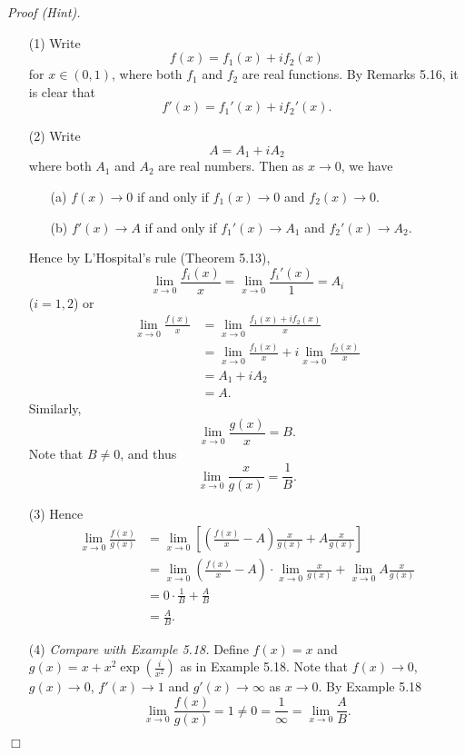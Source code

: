 \documentclass{article}
\begin{document}
\emph{Proof (Hint).}
\begin{enumerate}
  \item[(1)]
  Write
  \[
    f(x) = f_1(x) + i f_2(x)
  \]
  for $x \in (0,1)$,
  where both $f_1$ and  $f_2$ are real functions.
  By Remarks 5.16, it is clear that
  \[
    f'(x) = f_1'(x) + i f_2'(x).
  \]

  \item[(2)]
  Write
  \[
    A = A_1 + i A_2
  \]
  where both $A_1$ and $A_2$ are real numbers.
  Then as $x \to 0$, we have
  \begin{enumerate}
    \item[(a)]
    $f(x) \to 0$ if and only if $f_1(x) \to 0$ and $f_2(x) \to 0$.

    \item[(b)]
    $f'(x) \to A$ if and only if $f_1'(x) \to A_1$ and $f_2'(x) \to A_2$.
  \end{enumerate}

  Hence by L'Hospital's rule (Theorem 5.13),
  \[
    \lim_{x \to 0} \frac{f_i(x)}{x}
    = \lim_{x \to 0} \frac{f_i'(x)}{1} = A_i
  \]
  ($i = 1, 2$) or
  \begin{align*}
    \lim_{x \to 0} \frac{f(x)}{x}
    &= \lim_{x \to 0} \frac{f_1(x) + i f_2(x)}{x} \\
    &= \lim_{x \to 0} \frac{f_1(x)}{x} + i \lim_{x \to 0} \frac{f_2(x)}{x} \\
    &= A_1 + i A_2 \\
    &= A.
  \end{align*}
  Similarly,
  \[
    \lim_{x \to 0} \frac{g(x)}{x} = B.
  \]
  Note that $B \neq 0$, and thus
  \[
    \lim_{x \to 0} \frac{x}{g(x)} = \frac{1}{B}.
  \]

  \item[(3)]
  Hence
  \begin{align*}
    \lim_{x \to 0} \frac{f(x)}{g(x)}
    &= \lim_{x \to 0}
      \left[ \left( \frac{f(x)}{x} - A \right) \frac{x}{g(x)} + A\frac{x}{g(x)} \right] \\
    &= \lim_{x \to 0} \left( \frac{f(x)}{x} - A \right) \cdot \lim_{x \to 0} \frac{x}{g(x)}
      + \lim_{x \to 0} A\frac{x}{g(x)} \\
    &= 0 \cdot \frac{1}{B} + \frac{A}{B} \\
    &= \frac{A}{B}.
  \end{align*}

  \item[(4)]
  \emph{Compare with Example 5.18.}
  Define $f(x) = x$ and $g(x) = x + x^2 \exp(\frac{i}{x^2})$ as in Example 5.18.
  Note that $f(x) \to 0$, $g(x) \to 0$, $f'(x) \to 1$ and $g'(x) \to \infty$ as $x \to 0$.
  By Example 5.18
  \[
    \lim_{x \to 0} \frac{f(x)}{g(x)} = 1
    \neq 0 = \frac{1}{\infty} = \lim_{x \to 0} \frac{A}{B}.
  \]
\end{enumerate}
$\Box$ \\\\
\end{document}
